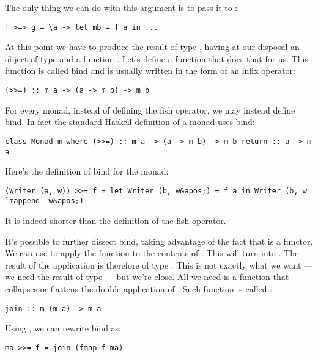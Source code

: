 The only thing we can do with this argument is to pass it to :

\begin{verbatim}
f >=> g = \a -> let mb = f a in ...
\end{verbatim}

At this point we have to produce the result of type ,
having at our disposal an object of type  and a function
. Let's define a function that
does that for us. This function is called bind and is usually written in
the form of an infix operator:

\begin{verbatim}
(>>=) :: m a -> (a -> m b) -> m b
\end{verbatim}

For every monad, instead of defining the fish operator, we may instead
define bind. In fact the standard Haskell definition of a monad uses
bind:

\begin{verbatim}
class Monad m where (>>=) :: m a -> (a -> m b) -> m b return :: a -> m a
\end{verbatim}

Here's the definition of bind for the  monad:

\begin{verbatim}
(Writer (a, w)) >>= f = let Writer (b, w&apos;) = f a in Writer (b, w `mappend` w&apos;)
\end{verbatim}

It is indeed shorter than the definition of the fish operator.

It's possible to further dissect bind, taking advantage of the fact that
 is a functor. We can use  to apply the function
 to the contents of . This
will turn  into . The result of the application
is therefore of type . This is not exactly what we
want --- we need the result of type  --- but we're close.
All we need is a function that collapses or flattens the double
application of . Such function is called :

\begin{verbatim}
join :: m (m a) -> m a
\end{verbatim}

Using , we can rewrite bind as:

\begin{verbatim}
ma >>= f = join (fmap f ma)
\end{verbatim}

